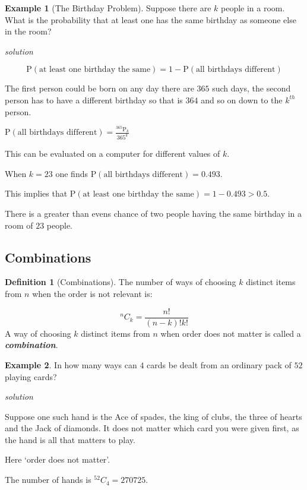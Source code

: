 \documentclass[
]{book}
\theoremstyle{definition}
\newtheorem{definition}{Definition}[chapter]
\theoremstyle{definition}
\newtheorem{example}{Example}[chapter]
\theoremstyle{definition}
\theoremstyle{definition}
\theoremstyle{remark}
\begin{document}
\begin{example}[The Birthday Problem]
\protect\hypertarget{exm:birthday}{}\label{exm:birthday}Suppose there are \(k\) people in a room. What is the probability that at least one has the same birthday as someone else in the room?

\emph{solution}

\[\text{P}(\text{at least one birthday the same}) = 1 - \text{P}(\text{all birthdays different})\]

The first person could be born on any day there are \(365\) such days, the second person has to have a different birthday so that is \(364\) and so on down to the \(k^{th}\) person.

\(\text{P}(\text{all birthdays different}) = \frac{^{365}\text{P}_k}{365^k}\)

This can be evaluated on a computer for different values of \(k\).

When \(k=23\) one finds \(\text{P}(\text{all birthdays different}) = 0.493\).

This implies that \(\text{P}(\text{at least one birthday the same}) = 1- 0.493 > 0.5\).

There is a greater than evens chance of two people having the same birthday in a room of \(23\) people.
\end{example}

\hypertarget{combinations}{%
\subsection{Combinations}\label{combinations}}

\begin{definition}[Combinations]
\protect\hypertarget{def:comb}{}\label{def:comb}The number of ways of choosing \(k\) distinct items from \(n\) when the order is not relevant is:

\[{}^nC_k = \frac{n!}{(n-k)!k!}\]
A way of choosing \(k\) distinct items from \(n\) when order does not matter is called a \textbf{\emph{combination}}.
\end{definition}

\begin{example}
In how many ways can \(4\) cards be dealt from an ordinary pack of \(52\) playing cards?

\emph{solution}

Suppose one such hand is the Ace of spades, the king of clubs, the three of hearts and the Jack of diamonds. It does not matter which card you were given first, as the hand is all that matters to play.

Here `order does not matter'.

The number of hands is \({}^{52}C_{4}=270725\).
\end{example}
\end{document}
